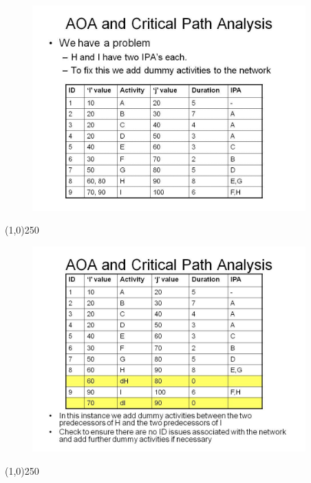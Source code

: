 \begin{frame}
\begin{figure}
	\centering
		\includegraphics[width = 10.5cm]{oldnotes/Slide78.jpg}
\end{figure}
\end{frame}
\begin{center}\line(1,0){250}\end{center}


\begin{frame}
\begin{figure}
	\centering
		\includegraphics[width = 10.5cm]{oldnotes/Slide79.jpg}
\end{figure}
\end{frame}
\begin{center}\line(1,0){250}\end{center}


